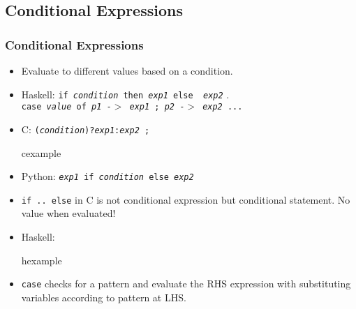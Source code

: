 \subsection{Conditional Expressions}
\begin{frame}
\frametitle{Conditional Expressions}
 \begin{itemize}[<+->]
  \item Evaluate to different values based on a condition.
  \item Haskell: \texttt{if {\em condition\/} then {\em exp1\/} else {\em
  exp2\/}}  .\\
	\hspace*{2em}\texttt{case {\em value\/} of  {\em p1\/} -$>$ 
		{\em exp1\/} ; {\em p2\/} -$>$ {\em exp2\/} ...}
  \item C: \texttt{({\em condition\/})?{\em exp1\/}:{\em exp2 \/}; }
\begin{beamercolorbox}{cexample}
\codecondC
\end{beamercolorbox}
  \item Python: \texttt{{\em exp1\/} if {\em condition\/} else {\em exp2\/}}
  \item \texttt{if .. else} in C is \alert{not} conditional expression but
  conditional statement. No value when evaluated!
\end{itemize}
\end{frame}


\begin{frame}
 \begin{itemize}
  \item Haskell:
\begin{beamercolorbox}{hexample}
 \codecondH
\end{beamercolorbox}
\item \texttt{case} checks for a pattern and evaluate the RHS expression
with substituting variables according to pattern at LHS.
 \end{itemize}
\end{frame}

